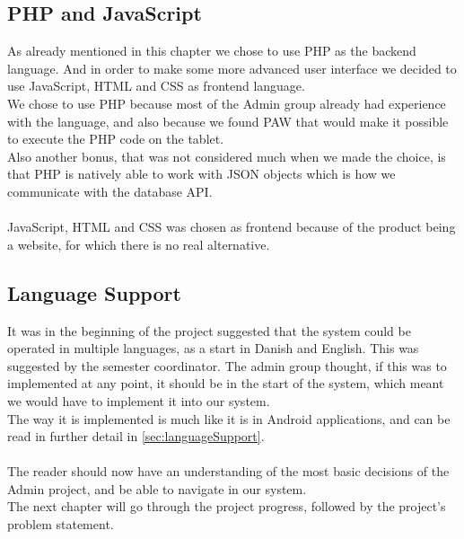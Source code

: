 \subsection{PHP and JavaScript}
As already mentioned in this chapter we chose to use PHP as the backend language. And in order to make some more advanced user interface we decided to use JavaScript, HTML and CSS as frontend language.\\
We chose to use PHP because most of the Admin group already had experience with the language, and also because we found PAW that would make it possible to execute the PHP code on the tablet.\\
Also another bonus, that was not considered much when we made the choice, is that PHP is natively able to work with JSON objects which is how we communicate with the database API.\\
\\
JavaScript, HTML and CSS was chosen as frontend because of the product being a website, for which there is no real alternative.

\subsection{Language Support}
It was in the beginning of the project suggested that the system could be operated in multiple languages, as a start in Danish and English. This was suggested by the semester coordinator. The admin group thought, if this was to implemented at any point, it should be in the start of the system, which meant we would have to implement it into our system.\\
The way it is implemented is much like it is in Android applications, and can be read in further detail in \vref{sec:languageSupport}.\\
\\
The reader should now have an understanding of the most basic decisions of the Admin project, and be able to navigate in our system.\\
The next chapter will go through the project progress, followed by the project's problem statement.
